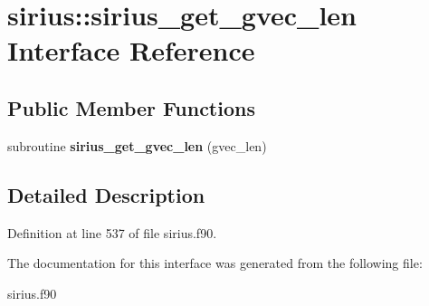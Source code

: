 \hypertarget{interfacesirius_1_1sirius__get__gvec__len}{}\section{sirius\+:\+:sirius\+\_\+get\+\_\+gvec\+\_\+len Interface Reference}
\label{interfacesirius_1_1sirius__get__gvec__len}
\subsection*{Public Member Functions}
\begin{DoxyCompactItemize}
\item 
\hypertarget{interfacesirius_1_1sirius__get__gvec__len_a39e76f8df5c9a5f8cda34a5b62bb9a92}{}subroutine {\bfseries sirius\+\_\+get\+\_\+gvec\+\_\+len} (gvec\+\_\+len)\label{interfacesirius_1_1sirius__get__gvec__len_a39e76f8df5c9a5f8cda34a5b62bb9a92}

\end{DoxyCompactItemize}


\subsection{Detailed Description}


Definition at line 537 of file sirius.\+f90.



The documentation for this interface was generated from the following file\+:\begin{DoxyCompactItemize}
\item 
sirius.\+f90\end{DoxyCompactItemize}
